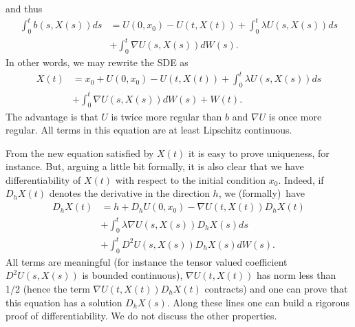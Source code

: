 \documentclass{article}
\begin{document}
and thus%
\begin{align*}
\int_{0}^{t}b\left(s,  X\left(  s\right)  \right)  ds  &  =U\left(
0,x_{0}\right)  -U\left(  t,X\left(  t\right)  \right)
+\int_{0}^{t}\lambda
U\left(  s,X\left(  s\right)  \right)  ds\\
&  +\int_{0}^{t}\nabla U\left(  s,X\left(  s\right)  \right)  dW\left(
s\right)  .
\end{align*}
In other words, we may rewrite the SDE as%
\begin{align*}
X\left(  t\right)   &  =x_{0}+U\left(  0,x_{0}\right)  -U\left(  t,X\left(
t\right)  \right)  +\int_{0}^{t}\lambda U\left(  s,X\left(  s\right)  \right)
ds\\
&  +\int_{0}^{t}\nabla U\left(  s,X\left(  s\right)  \right)  dW\left(
s\right)  +W\left(  t\right)  .
\end{align*}
The advantage is that $U$ is twice more regular than $b$ and $\nabla U$ is
once more regular. All terms in this equation are at least Lipschitz continuous.

From the new equation satisfied by $X\left(  t\right)  $ it is easy to prove
uniqueness, for instance. But, arguing a little bit formally,
 it is also clear
that we have differentiability of $X\left(  t\right)  $ with respect to the
initial condition $x_{0}$. Indeed, if $D_{h}X\left(  t\right)  $ denotes the
derivative in the direction $h$, we (formally)\ have%
\begin{align*}
D_{h}X\left(  t\right)   &  =h+D_{h}U\left(  0,x_{0}\right) - \nabla
U\left(
t,X\left(  t\right)  \right)  D_{h}X\left(  t\right) \\
&  +\int_{0}^{t}\lambda \nabla U\left(  s,X\left(  s\right)  \right)
 D_{h}X\left(
s\right)  ds\\
&  +\int_{0}^{t}D^{2}U\left(  s,X\left(  s\right)  \right)  D_{h}X\left(
s\right)  dW\left(  s\right)  .
\end{align*}
All terms are meaningful (for instance the tensor valued coefficient
$D^{2}U\left(  s,X\left(  s\right)  \right)  $ is bounded
continuous), $\nabla U\left(  t,X\left(  t\right)  \right)  $ has
norm less than 1/2 (hence the term  $\nabla U\left(  t,X\left(
t\right) \right) D_{h}X\left(  t\right)  $ contracts) and one can
prove that this equation has a solution $D_{h}X\left( s\right)  $.
Along these lines one can build a rigorous proof of
differentiability. We do not discuss the other properties.



\end{document}
